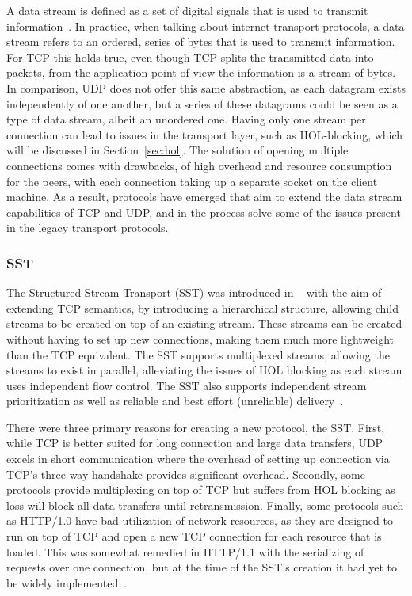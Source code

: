 \documentclass[english, 12pt, a4paper, elec, utf8, a-2b, online]{aaltothesis}
\begin{document}
A data stream is defined as a set of digital signals that is used to transmit
information~\cite{data_stream}. In practice, when talking about internet
transport protocols, a data stream refers to an ordered, series of bytes that is
used to transmit information. For TCP this holds true, even though TCP splits
the transmitted data into packets, from the application point of view the
information is a stream of bytes. In comparison, UDP does not offer this same
abstraction, as each datagram exists independently of one another, but a series
of these datagrams could be seen as a type of data stream, albeit an unordered one.
Having only one stream per connection can lead to issues in the transport layer, such as HOL-blocking,
which will be discussed in Section~\ref{sec:hol}. The solution of opening multiple
connections comes with drawbacks, of high overhead and resource consumption for
the peers, with each connection taking up a separate socket on the client machine.
As a result, protocols have emerged that aim to extend the data stream capabilities
of TCP and UDP, and in the process solve some of the issues present in the legacy
transport protocols.

\subsubsection{SST}

The Structured Stream Transport (SST) was introduced in ~\cite{sst} with the aim
of extending TCP semantics, by introducing a hierarchical structure, allowing
child streams to be created on top of an existing stream. These streams can
be created without having to set up new connections, making them much more lightweight
than the TCP equivalent. The SST supports multiplexed streams, allowing the streams
to exist in parallel, alleviating the issues of HOL blocking as each stream uses
independent flow control. The SST also supports independent stream prioritization
as well as reliable and best effort (unreliable) delivery~\cite{sst}.

There were three primary reasons for creating a new protocol, the SST. First, while
TCP is better suited for long connection and large data transfers, UDP excels
in short communication where the overhead of setting up connection via TCP's three-way
handshake provides significant overhead. Secondly, some protocols provide
multiplexing on top of TCP but suffers from HOL blocking as loss will block all
data transfers until retransmission. Finally, some protocols such as HTTP/1.0
have bad utilization of network resources, as they are designed to run on top of TCP
and open a new TCP connection for each resource that is loaded. This
was somewhat remedied in HTTP/1.1 with the serializing of requests over one connection,
but at the time of the SST's creation it had yet to be widely implemented~\cite{sst}.
\end{document}
